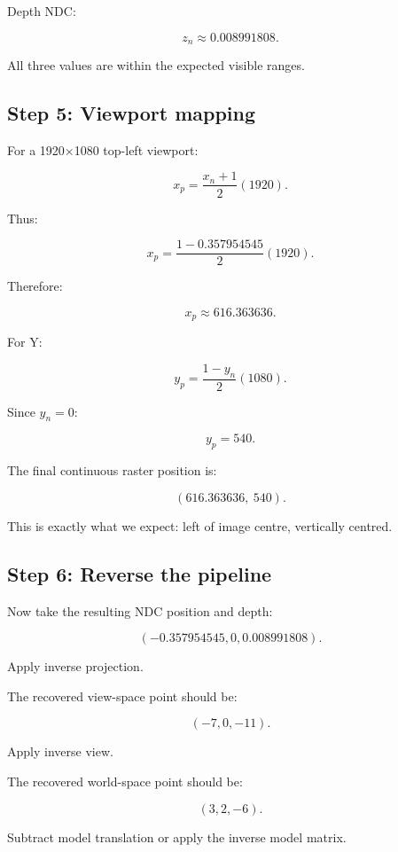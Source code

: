 Depth NDC:

\[ \boxed{z_n\approx0.008991808}. \]

All three values are within the expected visible ranges.

\subsection{Step 5: Viewport mapping}\label{02-foundations-ii-ch037-step-5-viewport-mapping}

\hypertarget{02-foundations-ii-ch037-step-5-viewport-mapping}{}

For a 1920×1080 top-left viewport:

\[ x_p=\frac{x_n+1}{2}(1920). \]

Thus:

\[ x_p= \frac{1-0.357954545}{2}(1920). \]

Therefore:

\[ \boxed{x_p\approx616.363636}. \]

For Y:

\[ y_p=\frac{1-y_n}{2}(1080). \]

Since \(y_n=0\):

\[ \boxed{y_p=540}. \]

The final continuous raster position is:

\[ \boxed{ (616.363636,\ 540). } \]

This is exactly what we expect: left of image centre, vertically centred.

\subsection{Step 6: Reverse the pipeline}\label{02-foundations-ii-ch037-step-6-reverse-the-pipeline}

\hypertarget{02-foundations-ii-ch037-step-6-reverse-the-pipeline}{}

Now take the resulting NDC position and depth:

\[ (-0.357954545,0,0.008991808). \]

Apply inverse projection.

The recovered view-space point should be:

\[ \boxed{(-7,0,-11)}. \]

Apply inverse view.

The recovered world-space point should be:

\[ \boxed{(3,2,-6)}. \]

Subtract model translation or apply the inverse model matrix.

